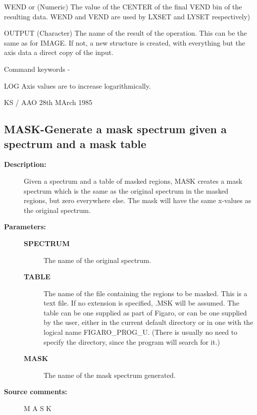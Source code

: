 \begin{description}
\begin{description}
\begin{terminalv}
 WEND  or   (Numeric) The value of the CENTER of the final
 VEND        bin of the resulting data. WEND and VEND are used
             by  LXSET and LYSET respectively)

 OUTPUT     (Character) The name of the result of the operation.
            This can be the same as for IMAGE.  If not, a new structure
            is created, with everything but the axis data a direct
            copy of the input.

 Command keywords -

 LOG    Axis values are to increase logarithmically.

                                  KS / AAO 28th MArch 1985
\end{terminalv}
\end{description}
\subsection{MASK-\label{MASK}Generate a mask spectrum given a spectrum and a mask table}
\begin{description}

\item [\textbf{Description:}]
 Given a spectrum and a table of masked regions, MASK creates a
 mask spectrum which is the same as the original spectrum in the
 masked regions, but zero everywhere else.   The mask will have
 the same x-values as the original spectrum.

\item [\textbf{Parameters:}]
\begin{description}
\item [\textbf{SPECTRUM}]
 The name of the original spectrum.
\item [\textbf{TABLE}]
 The name of the file containing the regions
 to be masked.  This is a text file.  If no extension is
 specified, .MSK will be assumed.  The table can be one
 supplied as part of Figaro, or can be one supplied by
 the user, either in the current default directory or
 in one with the logical name FIGARO\_PROG\_U.  (There is
 usually no need to specify the directory, since the
 program will search for it.)
\item [\textbf{MASK}]
 The name of the mask spectrum generated.
\end{description}

\item [\textbf{Source comments:}]
\begin{terminalv}
 M A S K


\end{terminalv}
\end{description}
\end{description}
